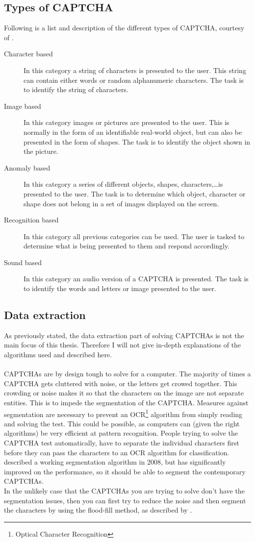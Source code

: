 \documentclass[pdftex,a4paper,12pt,twoside]{report}
\theoremstyle{plain} \newtheorem{theorem}{Theorem} \newtheorem{proposition}{Proposition} \newtheorem{lemma}{Lemma} \newtheorem*{corollary}{Corollary}
\theoremstyle{definition} \newtheorem{definition}{Definition} \newtheorem{conjecture}{Conjecture} \newtheorem*{example}{Example} \newtheorem{algorithm}{Algorithm}
\theoremstyle{remark} \newtheorem*{remark}{Remark} \newtheorem*{note}{Note} \newtheorem{case}{Case}
\begin{document}
\subsection{Types of CAPTCHA}
Following is a list and description of the different types of CAPTCHA, courtesy of \citep{Sauer2008}.
\begin{description}
\item[Character based]In this category a string of characters is presented to the user. This string can contain either words or random alphanumeric characters. The task is to identify the string of characters.
\item[Image based]In this category images or pictures are presented to the user. This is normally in the form of an identifiable real-world object, but can also be presented in the form of shapes. The task is to identify the object shown in the picture.
\item[Anomaly based]In this category a series of different objects, shapes, characters,\ldots is presented to the user. The task is to determine which object, character or shape does not belong in a set of images displayed on the screen.
\item[Recognition based]In this category all previous categories can be used. The user is tasked to determine what is being presented to them and respond accordingly.
\item[Sound based]In this category an audio version of a CAPTCHA is presented. The task is to identify the words and letters or image presented to the user.
\end{description}
\subsection{Data extraction}
As previously stated, the data extraction part of solving CAPTCHAs is not the main focus of this thesis. Therefore I will not give in-depth explanations of the algorithms used and described here.\\\\CAPTCHAs are by design tough to solve for a computer. The majority of times a CAPTCHA gets cluttered with noise, or the letters get crowed together. This crowding or noise makes it so that the characters on the image are not separate entities. This is to impede the segmentation of the CAPTCHA. Measures against segmentation are necessary to prevent an OCR\footnote{Optical Character Recognition} algorithm from simply reading and solving the test. This could be possible, as computers can (given the right algorithms) be very efficient at pattern recognition. People trying to solve the CAPTCHA test automatically, have to separate the individual characters first before they can pass the characters to an OCR algorithm for classification.\\\citep{Yan2008} described a working segmentation algorithm in 2008, but \citep{Huang2010} has significantly improved on the performance, so it should be able to segment the contemporary CAPTCHAs.\\In the unlikely case that the CAPTCHAs you are trying to solve don't have the segmentation issues, then you can first try to reduce the noise and then segment the characters by using the flood-fill method, as described by \citep{Cai2008}.
\end{document}
